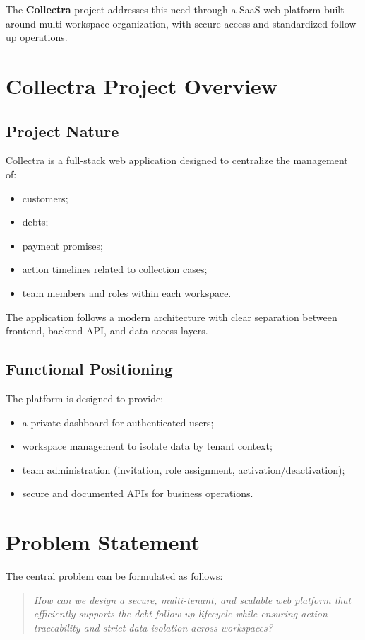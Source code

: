 \documentclass[12pt,a4paper]{report}
\begin{document}
The \textbf{Collectra} project addresses this need through a SaaS web platform built around multi-workspace organization, with secure access and standardized follow-up operations.

\section{Collectra Project Overview}
\subsection{Project Nature}
Collectra is a full-stack web application designed to centralize the management of:
\begin{itemize}
  \item customers;
  \item debts;
  \item payment promises;
  \item action timelines related to collection cases;
  \item team members and roles within each workspace.
\end{itemize}

The application follows a modern architecture with clear separation between frontend, backend API, and data access layers.

\subsection{Functional Positioning}
The platform is designed to provide:
\begin{itemize}
  \item a private dashboard for authenticated users;
  \item workspace management to isolate data by tenant context;
  \item team administration (invitation, role assignment, activation/deactivation);
  \item secure and documented APIs for business operations.
\end{itemize}

\section{Problem Statement}
The central problem can be formulated as follows:

\begin{quote}
\textit{How can we design a secure, multi-tenant, and scalable web platform that efficiently supports the debt follow-up lifecycle while ensuring action traceability and strict data isolation across workspaces?}
\end{quote}
\end{document}
